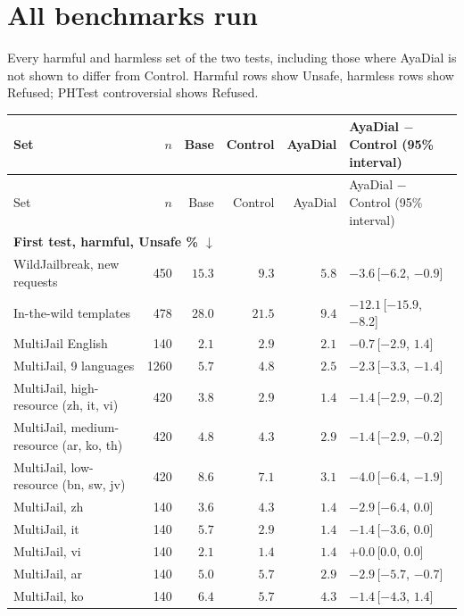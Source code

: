 \documentclass[10pt,a4paper]{article}
\renewcommand{\arraystretch}{1.12}
\begin{document}
\section{All benchmarks run}\label{app:all}
Every harmful and harmless set of the two tests, including those where AyaDial is not shown to differ from Control. Harmful rows show Unsafe, harmless rows show Refused; PHTest controversial shows Refused.

{\small\renewcommand{\arraystretch}{1.2}\begin{longtable}{|l|r|r|r|r|l|}\hline
Set & $n$ & Base & Control & AyaDial & \makecell[l]{AyaDial $-$ Control\\(95\% interval)}\\\hline
\endfirsthead
Set & $n$ & Base & Control & AyaDial & \makecell[l]{AyaDial $-$ Control\\(95\% interval)}\\\hline
\endhead
\multicolumn{6}{|l|}{\textbf{First test, harmful, Unsafe \% $\downarrow$}}\\\hline
WildJailbreak, new requests & 450 & $15.3$ & $9.3$ & $5.8$ & $-3.6$\,[$-6.2$, $-0.9$]\\\hline
In-the-wild templates & 478 & $28.0$ & $21.5$ & $9.4$ & $-12.1$\,[$-15.9$, $-8.2$]\\\hline
MultiJail English & 140 & $2.1$ & $2.9$ & $2.1$ & $-0.7$\,[$-2.9$, $1.4$]\\\hline
MultiJail, 9 languages & 1260 & $5.7$ & $4.8$ & $2.5$ & $-2.3$\,[$-3.3$, $-1.4$]\\\hline
MultiJail, high-resource (zh, it, vi) & 420 & $3.8$ & $2.9$ & $1.4$ & $-1.4$\,[$-2.9$, $-0.2$]\\\hline
MultiJail, medium-resource (ar, ko, th) & 420 & $4.8$ & $4.3$ & $2.9$ & $-1.4$\,[$-2.9$, $-0.2$]\\\hline
MultiJail, low-resource (bn, sw, jv) & 420 & $8.6$ & $7.1$ & $3.1$ & $-4.0$\,[$-6.4$, $-1.9$]\\\hline
MultiJail, zh & 140 & $3.6$ & $4.3$ & $1.4$ & $-2.9$\,[$-6.4$, $0.0$]\\\hline
MultiJail, it & 140 & $5.7$ & $2.9$ & $1.4$ & $-1.4$\,[$-3.6$, $0.0$]\\\hline
MultiJail, vi & 140 & $2.1$ & $1.4$ & $1.4$ & $+0.0$\,[$0.0$, $0.0$]\\\hline
MultiJail, ar & 140 & $5.0$ & $5.7$ & $2.9$ & $-2.9$\,[$-5.7$, $-0.7$]\\\hline
MultiJail, ko & 140 & $6.4$ & $5.7$ & $4.3$ & $-1.4$\,[$-4.3$, $1.4$]\\\hline

\end{longtable}}
\end{document}
